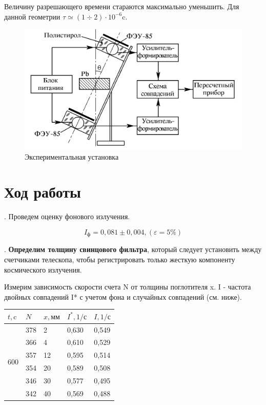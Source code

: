 \documentclass[a4paper,12pt]{article} %
\begin{document}
\medskip
	
\noindent Величину разрешающего времени стараются максимально уменьшить. Для данной геометрии $\tau \simeq (1\div 2) \cdot 10^{-6}$c.
	
	\begin{figure}[h!]
		\centering
		\includegraphics[width=0.8\linewidth]{kosmos.png}
		\caption{Экспериментальная установка}
	\end{figure}
	
\newpage
	
\section{Ход работы}

. Проведем оценку фонового излучения.

$$I_\text{ф} = 0,081 \pm 0,004, ( \varepsilon = 5 \%)$$

. \textbf{Определим толщину свинцового фильтра}, который следует установить между счетчиками телескопа, чтобы регистрировать только жесткую компоненту космического излучения.

\medskip

\noindent Измерим зависимость скорости счета N от толщины поглотителя x. I - частота двойных совпадений I* с учетом фона и случайных совпадений (см. ниже).

\begin{table}[h!]
\begin{tabular}{|c|l|l|l|l|}
\hline
\multicolumn{1}{|l|}{$t, \text{c}$} & $N$ & $x, \text{мм}$ & $I^*, \text{1/с}$ & $I, \text{1/с}$ \\ \hline
\multirow{6}{*}{600}                & 378 & 2              & 0,630            & 0,549           \\ \cline{2-5} 
                                    & 366 & 4              & 0,610            & 0,529           \\ \cline{2-5} 
                                    & 357 & 12             & 0,595            & 0,514           \\ \cline{2-5} 
                                    & 354 & 20             & 0,589            & 0,508           \\ \cline{2-5} 
                                    & 346 & 30             & 0,577            & 0,495           \\ \cline{2-5} 
                                    & 342 & 40             & 0,569            & 0,488           \\ \hline
\end{tabular}
\end{table}
\end{document}
